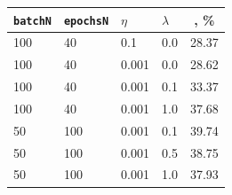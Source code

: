 \documentclass{article}
\begin{document}
	\begin{center}
	\begin{tabular}{|l|l|l|l|c|}
		\hline
		\texttt{batchN} & \texttt{epochsN} & $\eta$ & $\lambda$ & \text{Accuracy}, \% \\ \hline
		100 & 40 & 0.1 & 0.0 & 28.37 \\
		100 & 40 & 0.001 & 0.0 & 28.62\\
		100 & 40 & 0.001 & 0.1 &  33.37\\
		100 & 40 & 0.001 & 1.0 & 37.68\\ 
		50 & 100 & 0.001 & 0.1 & 39.74\\
		50 & 100 & 0.001 & 0.5	 & 38.75\\
		50 & 100 & 0.001 & 1.0 & 37.93\\\hline
	\end{tabular}
	\end{center}

\newpage
\end{document}
